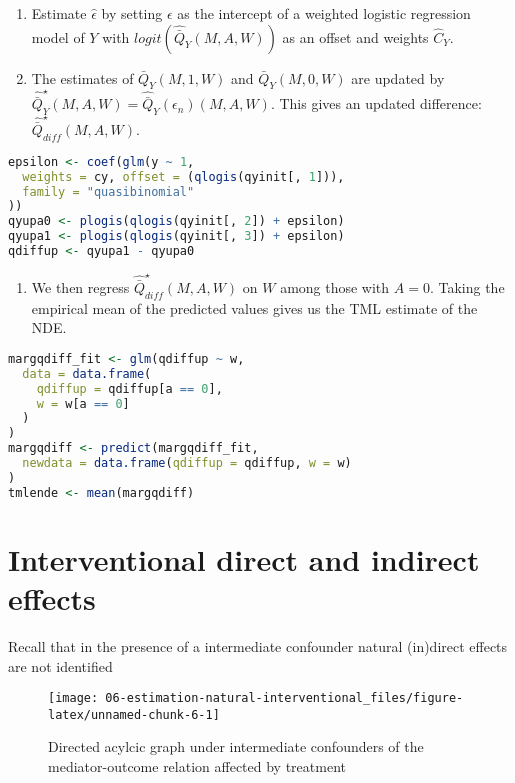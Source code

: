 \documentclass[
  12pt,
]{book}
\providecommand{\tightlist}{%
  \setlength{\itemsep}{0pt}\setlength{\parskip}{0pt}}
\theoremstyle{definition}
\theoremstyle{definition}
\theoremstyle{definition}
\newcommand{\1}{\mathbbm{1}}
\begin{document}
\begin{enumerate}
\def\labelenumi{\arabic{enumi}.}
\setcounter{enumi}{3}
\item
  Estimate \(\hat{\epsilon}\) by setting \(\epsilon\) as the intercept of a
  weighted logistic regression model of \(Y\) with
  \(logit(\hat{\bar{Q}}_{Y}(M,A,W))\) as an offset and weights \(\hat{C}_{Y}\).
\item
  The estimates of \(\bar{Q}_{Y}(M,1,W)\) and \(\bar{Q}_{Y}(M,0,W)\) are updated
  by \(\hat{\bar{Q}}^{\star}_{Y}(M,A,W) = \hat{\bar{Q}}_{Y}(\epsilon_n)(M,A,W)\). This gives an updated difference:
  \(\hat{\bar{Q}}^{\star}_{diff}(M,A,W)\).
\end{enumerate}

\begin{lstlisting}[language=R]
epsilon <- coef(glm(y ~ 1,
  weights = cy, offset = (qlogis(qyinit[, 1])),
  family = "quasibinomial"
))
qyupa0 <- plogis(qlogis(qyinit[, 2]) + epsilon)
qyupa1 <- plogis(qlogis(qyinit[, 3]) + epsilon)
qdiffup <- qyupa1 - qyupa0
\end{lstlisting}

\begin{enumerate}
\def\labelenumi{\arabic{enumi}.}
\setcounter{enumi}{5}
\tightlist
\item
  We then regress \(\hat{\bar{Q}}^{\star}_{diff}(M,A,W)\) on \(W\) among those
  with \(A=0\). Taking the empirical mean of the predicted values gives us the
  TML estimate of the NDE.
\end{enumerate}

\begin{lstlisting}[language=R]
margqdiff_fit <- glm(qdiffup ~ w,
  data = data.frame(
    qdiffup = qdiffup[a == 0],
    w = w[a == 0]
  )
)
margqdiff <- predict(margqdiff_fit,
  newdata = data.frame(qdiffup = qdiffup, w = w)
)
tmlende <- mean(margqdiff)
\end{lstlisting}

\hypertarget{interventional-direct-and-indirect-effects}{%
\section{Interventional direct and indirect effects}\label{interventional-direct-and-indirect-effects}}

Recall that in the presence of a intermediate confounder natural (in)direct effects are not identified

\begin{figure}

{\centering \texttt{[image: 06-estimation-natural-interventional\_files/figure-latex/unnamed-chunk-6-1]} 

}

\caption{Directed acylcic graph under intermediate confounders of the mediator-outcome relation affected by treatment}\label{fig:unnamed-chunk-6}
\end{figure}
\end{document}
